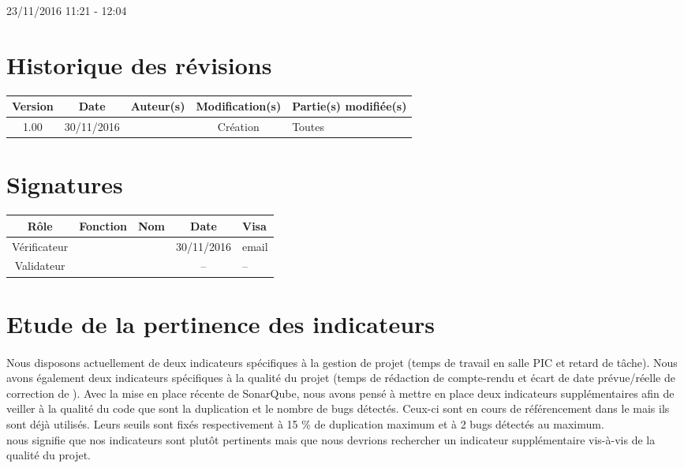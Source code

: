 \documentclass [a4paper] {article}
\begin{document}
\rhead{}

23/11/2016
\hfill   
\hfill 	11:21 - 12:04 				%



\section*{Historique des révisions}
\begin{center}
			\begin{tabular}{| c | c | c | c | p{4cm} |}
				\hline
				\rowcolor{Gray}
				Version & Date & Auteur(s) & Modification(s) & Partie(s) modifiée(s)		 \\
				\hline
				1.00 & 30/11/2016 & \Kafui & Création & Toutes \\
		\hline		
			\end{tabular}
		\end{center}

\section*{Signatures}

		\begin{center}
			\begin{tabular}{| c | c | c | c | p{4cm} |}
				\hline
				\rowcolor{Gray}
				Rôle & Fonction & Nom & Date & Visa		 \\
				\hline
				Vérificateur & \RGC & \Melissa & 30/11/2016 & email \\[30pt]
				\hline
				Validateur & \CP & \Pierre & -- & -- \\[30pt]	
				\hline
			\end{tabular}
		\end{center}


\section{Etude de la pertinence des indicateurs}
\paragraph*{}
Nous disposons actuellement de deux indicateurs spécifiques à la gestion de projet (temps de travail en salle PIC et retard de tâche). Nous avons également deux indicateurs spécifiques à la qualité du projet (temps de rédaction de compte-rendu et écart de date prévue/réelle de correction de \FT{}).
Avec la mise en place récente de SonarQube, nous avons pensé à mettre en place deux indicateurs supplémentaires afin de veiller à la qualité du code que sont la duplication et le nombre de bugs détectés. Ceux-ci sont en cours de référencement dans le \PQ{} mais ils sont déjà utilisés.
Leurs seuils sont fixés respectivement à 15 \% de duplication maximum et à 2 bugs détectés au maximum.\\
\nomTuteurQualite{} nous signifie que nos indicateurs sont plutôt pertinents mais que nous devrions rechercher un indicateur supplémentaire vis-à-vis de la qualité du projet.
\end{document}
